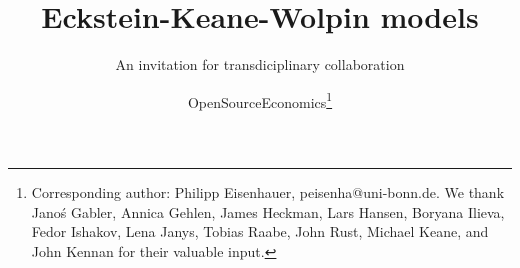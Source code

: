 
\title{Eckstein-Keane-Wolpin models}
\subtitle{An invitation for transdiciplinary collaboration}
\author{OpenSourceEconomics\thanks{Corresponding author: Philipp Eisenhauer, peisenha@uni-bonn.de. We thank  Jano\'s Gabler, Annica Gehlen, James Heckman, Lars Hansen, Boryana Ilieva, Fedor Ishakov, Lena Janys, Tobias Raabe, John Rust, Michael Keane, and John Kennan for their valuable input.}}
\date{}
